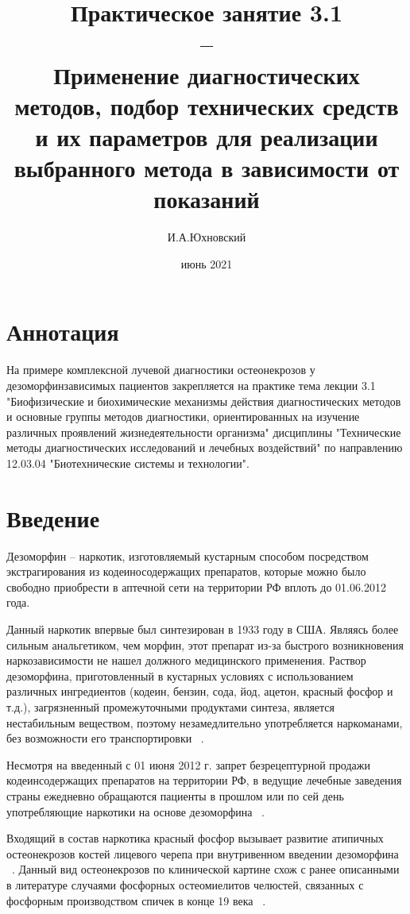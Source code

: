 \documentclass[11pt]{article}
\title{\textbf{Практическое занятие 3.1  \\ -- \\ 
		Применение диагностических методов, подбор технических средств и их параметров для реализации выбранного метода в зависимости от показаний}}
\author{И.А.Юхновский}
\date{июнь 2021}
\begin{document}
	
	\maketitle
	\thispagestyle{empty}
	\section*{Аннотация}
	На примере комплексной лучевой диагностики остеонекрозов у дезоморфинзависимых пациентов закрепляется на практике тема лекции 3.1 "Биофизические и биохимические механизмы действия диагностических методов и основные группы методов диагностики, ориентированных на изучение различных проявлений жизнедеятельности организма" дисциплины "Технические методы диагностических исследований и лечебных воздействий" по направлению 12.03.04 "Биотехнические системы и технологии".
	
		\tableofcontents{}
	
	\section{Введение}
	Дезоморфин – наркотик,	изготовляемый кустарным способом посредством экстрагирования из кодеиносодержащих препаратов, которые можно было свободно приобрести в аптечной сети на территории РФ вплоть до 01.06.2012 года. 
	 
	Данный наркотик впервые был синтезирован в 1933 году в США. Являясь более сильным анальгетиком, чем морфин, этот препарат из-за быстрого возникновения наркозависимости не нашел должного медицинского  применения. Раствор дезоморфина, приготовленный в кустарных условиях с использованием различных ингредиентов (кодеин,	бензин, сода, йод, ацетон, красный фосфор и т.д.), загрязненный промежуточными продуктами синтеза, является нестабильным веществом, поэтому незамедлительно употребляется наркоманами, без возможности его транспортировки  ~\cite{kataev}.

	Несмотря на введенный с 01 июня 2012 г. запрет безрецептурной продажи кодеинсодержащих препаратов на территории РФ, в ведущие лечебные заведения страны ежедневно обращаются пациенты в прошлом или по сей день употребляющие наркотики на основе дезоморфина ~\cite{rejr}. 
	
	Входящий в состав наркотика красный фосфор вызывает развитие атипичных остеонекрозов костей лицевого черепа при внутривенном введении дезоморфина  ~\cite{babkova}. Данный вид остеонекрозов по клинической картине схож с ранее описанными	в литературе случаями фосфорных остеомиелитов челюстей, связанных с фосфорным производством спичек  в конце 19 века ~\cite{basin}. 
	
\end{document}
